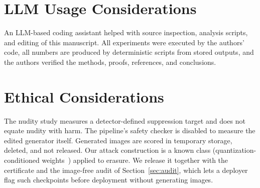 \documentclass[conference]{IEEEtran}
\begin{document}
\section*{LLM Usage Considerations}
An LLM-based coding assistant helped with source inspection, analysis scripts, and
editing of this manuscript. All experiments were executed by the authors'
code, all numbers are produced by deterministic scripts from stored outputs, and the
authors verified the methods, proofs, references, and conclusions.

\section*{Ethical Considerations}
The nudity study measures a detector-defined suppression target and does not equate
nudity with harm. The pipeline's safety checker is disabled to measure the edited
generator itself. Generated images are scored in temporary storage, deleted, and not
released. Our attack construction is a known class (quantization-conditioned
weights~\cite{egashira2024}) applied to erasure. We release it together with the
certificate and the image-free audit of Section~\ref{sec:audit}, which lets a deployer
flag such checkpoints before deployment without generating images.




\appendices
\end{document}
